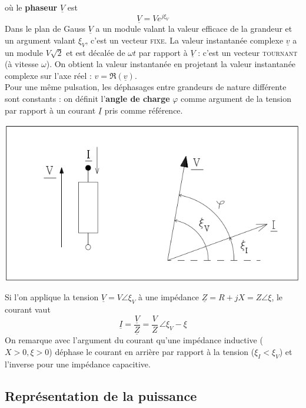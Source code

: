 où le \textbf{phaseur} $\underline{V}$ est 
\begin{equation}
	\underline{V} = Ve^{j\xi_V}
\end{equation}
Dans le plan de Gauss $\underline{V}$ a un module valant la valeur efficace 
de la grandeur et un argument valant $\xi_V$, c'est un vecteur \textsc{fixe}.
La valeur instantanée complexe $\underline{v}$ a un module $V\sqrt{2}$ et est 
décalée de $\omega t$ par rapport à $\underline{V}$ : c'est un vecteur 
\textsc{tournant} (à vitesse $\omega$). On obtient la valeur instantanée en projetant 
la valeur instantanée complexe sur l'axe réel : $v = \Re(\underline{v})$.\\
	
Pour une même pulsation, les déphasages entre grandeurs de nature différente sont constants : on définit l'\textbf{angle de charge} $\varphi$ comme argument de la tension par rapport à un
courant $\underline{I}$ pris comme référence. 
	
\begin{center}
	\includegraphics[scale=0.4]{ch1/image3.png}
\end{center}	
		
Si l'on applique la tension $\underline{V} = V\angle \xi_V$ à une impédance 
$\underline{Z} = R + jX = Z\angle \xi$, le courant vaut 
\begin{equation}
	\underline{I} = \frac{\underline{V}}{\underline{Z}} = \frac{V}{Z}\, \angle 
	\xi_V-\xi
\end{equation}
On remarque avec l'argument du courant qu'une impédance inductive ($X>0, 
\xi >0$) déphase le courant en arrière par rapport à la tension ($\xi _I < \xi _V$) et l'inverse 
pour une impédance capacitive.
	
	
\subsection{Représentation de la puissance}
